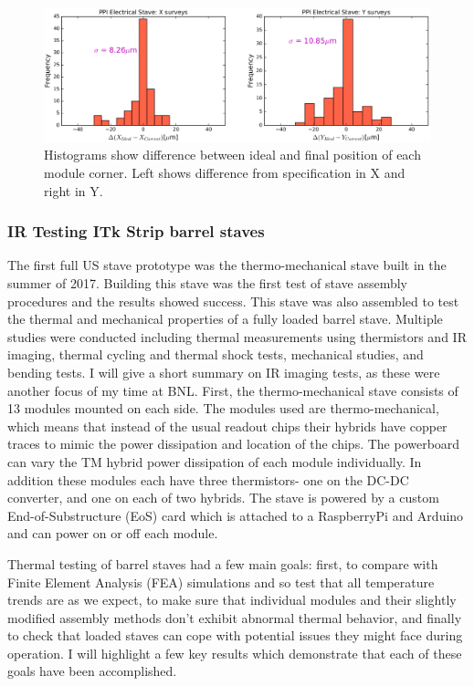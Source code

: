 \begin{figure}[!h]
        \centering
    \includegraphics[width=.8\textwidth]{Pictures/placementresults.png}
    \caption{Histograms show difference between ideal and final position of each module corner. Left shows difference from specification in X and right in Y.}
    \label{fig:placementresults}
\end{figure}

\subsubsection{IR Testing ITk Strip barrel staves}
The first full US stave prototype was the thermo-mechanical stave built in the summer of 2017.  Building this stave was the first test of stave assembly procedures and the results showed success. This stave was also assembled to test the thermal and mechanical properties of a fully loaded barrel stave. Multiple studies were conducted including thermal measurements using thermistors and IR imaging, thermal cycling and thermal shock tests, mechanical studies, and bending tests. I will give a short summary on IR imaging tests, as these were another focus of my time at BNL. First, the thermo-mechanical stave consists of 13 modules mounted on each side. The modules used are thermo-mechanical, which means that instead of the usual readout chips their hybrids have copper traces to mimic the power dissipation and location of the chips. The powerboard can vary the TM hybrid power dissipation of each module individually. In addition these modules each have three thermistors- one on the DC-DC converter, and one on each of two hybrids. The stave is powered by a custom End-of-Substructure (EoS) card which is attached to a RaspberryPi and Arduino and can power on or off each module.  

Thermal testing of barrel staves had a few main goals: first, to compare with Finite Element Analysis (FEA) simulations and so test that all temperature trends are as we expect, to make sure that individual modules and their slightly modified assembly methods don't exhibit abnormal thermal behavior, and finally to check that loaded staves can cope with potential issues they might face during operation. I will highlight a few key results which demonstrate that each of these goals have been accomplished. 

